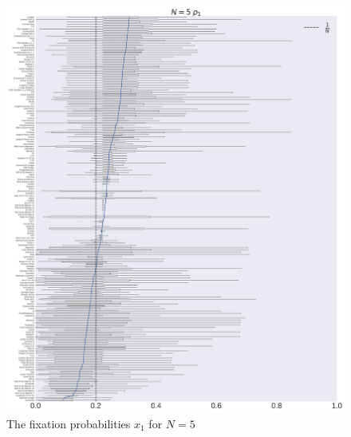 \documentclass[10pt,letterpaper]{article}
\begin{document}
\begin{figure}[!hbtp]
    \centering
    \includegraphics[width=\textwidth]{./boxplot_5_invade.pdf}
    \caption{The fixation probabilities \(x_1\) for \(N=5\)}
\end{figure}
\end{document}
